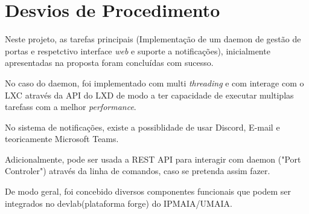 \chapter{Desvios de Procedimento}
\label{cap:detour}



Neste projeto, as tarefas principais (Implementação de um daemon de gestão de portas
e respetctivo interface \textit{web} e suporte a notificações), inicialmente 
apresentadas na proposta foram concluídas com sucesso.

No caso do daemon, foi implementado com multi \textit{threading} e com interage com
o LXC através da API do LXD de modo a ter capacidade de executar multiplas tarefass com a melhor
\textit{performance}.

No sistema de notificações, existe a possiblidade de usar Discord, E-mail e teoricamente Microsoft Teams.

Adicionalmente, pode ser usada a REST API para interagir com daemon ("Port Controler")
através da linha de comandos, caso se pretenda assim fazer.

De modo geral, foi concebido diversos componentes funcionais que podem ser integrados no
devlab(plataforma forge) do IPMAIA/UMAIA.